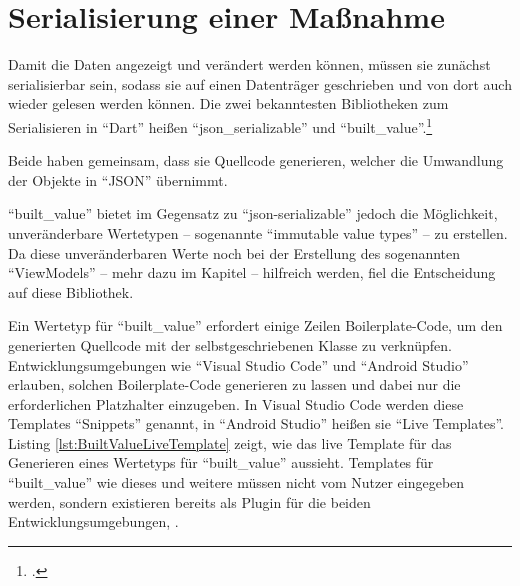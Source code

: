 \clearpage
\section{Serialisierung einer Maßnahme}

Damit die Daten angezeigt und verändert werden können, müssen sie zunächst serialisierbar sein, sodass sie auf einen Datenträger geschrieben und von dort auch wieder gelesen werden können.
Die zwei bekanntesten Bibliotheken zum Serialisieren in \enquote{Dart} heißen \enquote{json_serializable} und \enquote{built_value}.\footcite[Vgl.][]{JSONAndSerialization}


Beide haben gemeinsam, dass sie Quellcode generieren, welcher die Umwandlung der Objekte in \enquote{JSON} übernimmt.


\enquote{built_value} bietet im Gegensatz zu \enquote{json-serializable} jedoch die Möglichkeit, unveränderbare Wertetypen -- sogenannte \enquote{immutable value types} -- zu erstellen.
Da diese unveränderbaren Werte noch bei der Erstellung des sogenannten \enquote{ViewModels} --  mehr dazu im Kapitel  -- hilfreich werden,
fiel die Entscheidung auf diese Bibliothek.

Ein Wertetyp für \enquote{built_value} erfordert einige Zeilen Boilerplate-Code, um den generierten Quellcode mit der selbstgeschriebenen Klasse zu verknüpfen.
Entwicklungsumgebungen wie \enquote{Visual Studio Code} und \enquote{Android Studio} erlauben, solchen Boilerplate-Code generieren zu lassen und dabei nur die erforderlichen Platzhalter einzugeben.
In Visual Studio Code werden diese Templates \enquote{Snippets} genannt, in \enquote{Android Studio} heißen sie \enquote{Live Templates}.
 Listing \ref{lst:BuiltValueLiveTemplate} zeigt, wie das live Template für das Generieren eines Wertetyps  für \enquote{built_value} aussieht.
Templates für \enquote{built_value} wie dieses und weitere müssen nicht vom Nutzer eingegeben werden,
sondern existieren bereits als Plugin für die beiden Entwicklungsumgebungen, .


